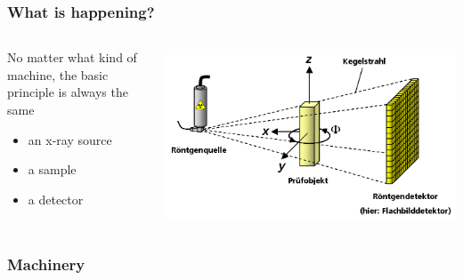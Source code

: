 \renewcommand{\imagewidth}{\textwidth}
\begin{frame}
	\frametitle{What is happening?}
	\begin{columns}%
		\begin{column}{0.5\textwidth}%
			No matter what kind of machine, the basic principle is always the same
			\begin{itemize}
				\item an x-ray source
				\item a sample
				\item a detector
			\end{itemize}
		\end{column}%
		\begin{column}{0.5\textwidth}%
			\centering%
			\includegraphics[width=\imagewidth]{./images/3D_Computed_Tomography}%
		\end{column}%
	\end{columns}%
\end{frame}

\begin{frame}
	\frametitle{Machinery}
	\begin{columns}
		\begin{column}{0.5\textwidth}
			\centering
			
		\end{column}
		\begin{column}{0.5\textwidth}
			\centering
			\only<1>{}%
			\only<2|handout:0>{}%
			\only<3|handout:0>{}%
		\end{column}
	\end{columns}
\end{frame}

